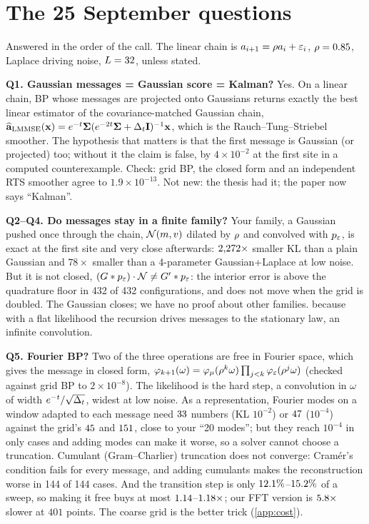 \documentclass[11pt,a4paper]{article}
\begin{document}
\section{The 25 September questions}
\label{app:questions}

Answered in the order of the call. The linear chain is $a_{i+1}=\rho a_i+\varepsilon_i$, $\rho=0.85$, Laplace driving noise,
$L=32$, unless stated.

\textbf{Q1. Gaussian messages = Gaussian score = Kalman?} Yes. On a linear chain, BP whose messages are projected onto Gaussians
returns exactly the best linear estimator of the covariance-matched Gaussian chain,
$\widehat{\mathbf{a}}_{\mathrm{LMMSE}}(\mathbf{x})=e^{-t}\mathbf{\Sigma}(e^{-2t}\mathbf{\Sigma}+\Delta_t\mathbf{I})^{-1}\mathbf{x}$, which is the Rauch--Tung--Striebel smoother. The hypothesis that matters is
that the first message is Gaussian (or projected) too; without it the claim is false, by $4\times10^{-2}$ at the first site in a
computed counterexample. Check: grid BP, the closed form and an independent RTS smoother agree to $1.9\times10^{-13}$.
 Not
new: the thesis had it; the paper now says ``Kalman''.

\textbf{Q2--Q4. Do messages stay in a finite family?} Your family, a Gaussian pushed once through the chain,
$\mathcal{N}\!\left(m,v\right)$ dilated by $\rho$ and convolved with $p_{\varepsilon}$, is exact at the first site and very close afterwards:
$2{,}272\times$ smaller KL than a plain Gaussian and $78\times$ smaller than a 4-parameter Gaussian+Laplace at low
noise. But it is not closed, $(G*p_{\varepsilon})\cdot\mathcal N\neq G'*p_{\varepsilon}$: the interior error is above the quadrature floor in 432 of
432 configurations, and does not move when the grid is doubled. The Gaussian closes; we have no proof about other families.
 because with a flat likelihood the recursion
drives messages to the stationary law, an infinite convolution.

\textbf{Q5. Fourier BP?} Two of the three operations are free in Fourier space, which gives the message in closed form,
$\varphi_{k+1}(\omega)=\varphi_\mu(\rho^k\omega)\prod_{j<k}\varphi_\varepsilon(\rho^j\omega)$ (checked against grid BP to
$2\times10^{-8}$). The likelihood is the hard step, a convolution in $\omega$ of width $e^{-t}/\sqrt{\Delta_t}$, widest at low noise.
As a representation, Fourier modes on a window adapted to each message need $33$ numbers (KL $10^{-2}$) or
$47$ ($10^{-4}$) against the grid's $45$ and $151$, close to your ``20 modes''; but they reach
$10^{-4}$ in only \cmpFourierReach{} cases and adding modes can make it worse, so a solver cannot choose a truncation. Cumulant
(Gram--Charlier) truncation does not converge: Cramér's condition fails for every message, and adding cumulants makes the
reconstruction worse in 144 of 144 cases. And the transition step is only $12.1\%$--$15.2\%$ of a sweep, so
making it free buys at most $1.14$--$1.18\times$; our FFT version is $5.8\times$ slower at $401$ points.
The coarse grid is the better trick (\ref{app:cost}).
\end{document}
